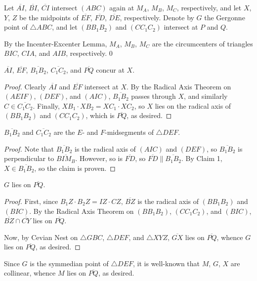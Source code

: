 Let $\overline{AI}$, $\overline{BI}$, $\overline{CI}$ intersect $(ABC)$ again at $M_A$, $M_B$, $M_C$, respectively, and let $X$, $Y$, $Z$ be the midpoints of $\overline{EF}$, $\overline{FD}$, $\overline{DE}$, respectively. Denote by $G$ the Gergonne point of $\triangle ABC$, and let $(BB_1B_2)$ and $(CC_1C_2)$ intersect at $P$ and $Q$.

By the Incenter-Excenter Lemma, $M_A$, $M_B$, $M_C$ are the circumcenters of triangles $BIC$, $CIA$, and $AIB$, respectively.
\setcounter{iclaim}0
\begin{iclaim}
    $\overline{AI}$, $\overline{EF}$, $\overline{B_1B_2}$, $\overline{C_1C_2}$, and $\overline{PQ}$ concur at $X$.
\end{iclaim}
\begin{proof}
    Clearly $\overline{AI}$ and $\overline{EF}$ intersect at $X$. By the Radical Axis Theorem on $(AEIF)$, $(DEF)$, and $(AIC)$, $\overline{B_1B_2}$ passes through $X$, and similarly $C\in\overline{C_1C_2}$. Finally, $XB_1\cdot XB_2=XC_1\cdot XC_2$, so $X$ lies on the radical axis of $(BB_1B_2)$ and $(CC_1C_2)$, which is $\overline{PQ}$, as desired.
\end{proof}
\begin{iclaim}
    $\overline{B_1B_2}$ and $\overline{C_1C_2}$ are the $E$- and $F$-midsegments of $\triangle DEF$.
\end{iclaim}
\begin{proof}
    Note that $\overline{B_1B_2}$ is the radical axis of $(AIC)$ and $(DEF)$, so $\overline{B_1B_2}$ is perpendicular to $\overline{BIM_B}$. However, so is $\overline{FD}$, so $\overline{FD}\parallel\overline{B_1B_2}$. By Claim 1, $X\in\overline{B_1B_2}$, so the claim is proven.
\end{proof}
\begin{iclaim}
    $G$ lies on $\overline{PQ}$.
\end{iclaim}
\begin{proof}
    First, since $B_1Z\cdot B_2Z=IZ\cdot CZ$, $\overline{BZ}$ is the radical axis of $(BB_1B_2)$ and $(BIC)$. By the Radical Axis Theorem on $(BB_1B_2)$, $(CC_1C_2)$, and $(BIC)$, $\overline{BZ}\cap\overline{CY}$ lies on $\overline{PQ}$.

    Now, by Cevian Nest on $\triangle GBC$, $\triangle DEF$, and $\triangle XYZ$, $\overline{GX}$ lies on $\overline{PQ}$, whence $G$ lies on $\overline{PQ}$, as desired.
\end{proof}

Since $G$ is the symmedian point of $\triangle DEF$, it is well-known that $M$, $G$, $X$ are collinear, whence $M$ lies on $\overline{PQ}$, as desired.
